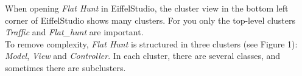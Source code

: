 When opening \emph{Flat Hunt} in EiffelStudio, the cluster view in the bottom left corner of EiffelStudio shows many clusters. For you only the top-level clusters \emph{Traffic} and \emph{Flat\_hunt} are important.\\

To remove complexity, \emph{Flat Hunt} is structured in three clusters (see Figure 1): \emph{Model}, \emph{View} and \emph{Controller}. In each cluster, there are several classes, and sometimes there are subclusters.

